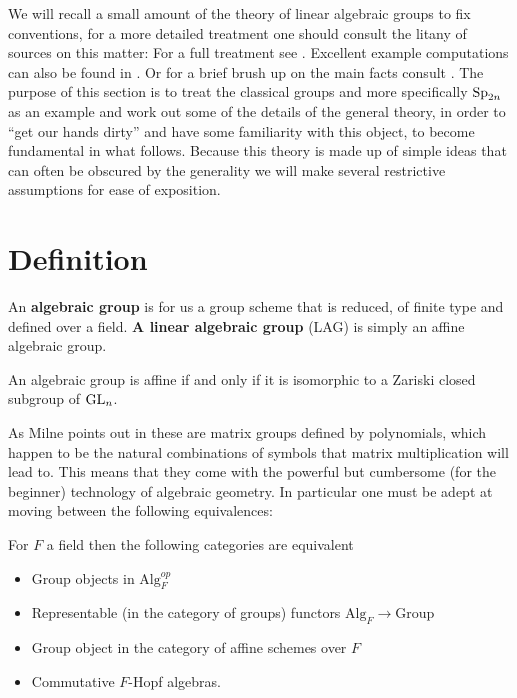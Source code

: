 We will recall a small amount of the theory of linear algebraic groups to fix conventions, for a more detailed treatment one should consult the litany of sources on this matter: For a full treatment see \cite{milneAlgebraicGroupsTheory2017}\cite{milneLieAlgebrasAlgebraic}\cite{milneBasicTheoryAffine}\cite{springerLinearAlgebraicGroups1998}. Excellent example computations can also be found in \cite{BuildingsClassicalGroups}\cite{makisumiStructureTheoryReductive}\cite{malleLinearAlgebraicGroups}\cite{NotesClassAlgebraic}. Or for a brief brush up on the main facts consult \cite[I.I.1]{borelAutomorphicFormsRepresentations1979}. The purpose of this section is to treat the classical groups and more specifically \(\operatorname{Sp}_{2n}\) as an example and work out some of the details of the general theory, in order to ``get our hands dirty'' and have some familiarity with this object, to become fundamental in what follows. Because this theory is made up of simple ideas that can often be obscured by the generality we will make several restrictive assumptions for ease of exposition. 

\section{Definition}
An \textbf{algebraic group} is for us a group scheme that is reduced, of finite type and defined over a field. \textbf{A linear algebraic group} (LAG) is simply an affine algebraic group.

\begin{proposition}
    An algebraic group is affine if and only if it is isomorphic to a Zariski closed subgroup of \(\operatorname{GL}_n\).
\end{proposition}

As Milne points out in \cite{milneAlgebraicGroupsTheory2017} these are matrix groups defined by polynomials, which happen to be the natural combinations of symbols that matrix multiplication will lead to. This means that they come with the powerful but cumbersome (for the beginner) technology of algebraic geometry. In particular one must be adept at moving between the following equivalences:
\begin{Theorem}
    For \(F\) a field then the following categories are equivalent
    \begin{itemize}
        \item Group objects in \(\mathrm{Alg}_F^{op}\)
        \item Representable (in the category of groups) functors \(\mathrm{Alg}_F \to \mathrm{Group}\)
        \item Group object in the category of affine schemes over \(F\)
        \item Commutative \(F\)-Hopf algebras.
    \end{itemize}
\end{Theorem}

